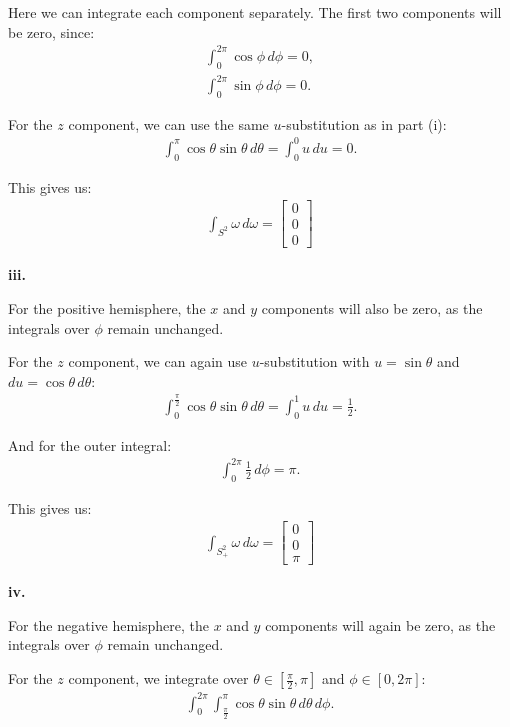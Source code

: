 Here we can integrate each component separately.
The first two components will be zero, since:
\begin{gather*}
\int_{0}^{2\pi} \cos\phi \, d\phi = 0, \\
\int_{0}^{2\pi} \sin\phi \, d\phi = 0.
\end{gather*}

For the $z$ component, we can use the same $u$-substitution as in part (i):
\begin{gather*}
\int_{0}^{\pi} \cos\theta\sin\theta \, d\theta
= \int_{0}^{0} u \, du = 0.
\end{gather*}

This gives us:
\begin{gather*}
\boxed{
\int_{S^2} \omega \, d\omega =
\begin{bmatrix}
0 \\ 0 \\ 0
\end{bmatrix}
}
\end{gather*}

\textbf{iii.}

For the positive hemisphere, the $x$ and $y$ components will also be zero, as the integrals over $\phi$ remain unchanged.

For the $z$ component, we can again use $u$-substitution with $u=\sin\theta$ and $du=\cos\theta\,d\theta$:
\begin{gather*}
\int_{0}^{\frac{\pi}{2}} \cos\theta\sin\theta \, d\theta
= \int_{0}^{1} u \, du
= \frac{1}{2}.
\end{gather*}

And for the outer integral:
\begin{gather*}
\int_{0}^{2\pi} \frac{1}{2} \, d\phi = \pi.
\end{gather*}

This gives us:
\begin{gather*}
\boxed{
\int_{S^2_+} \omega \, d\omega =
\begin{bmatrix}
0 \\ 0 \\ \pi
\end{bmatrix}
}
\end{gather*}


\textbf{iv.}

For the negative hemisphere, the $x$ and $y$ components will again be zero, as the integrals over $\phi$ remain unchanged.

For the $z$ component, we integrate over
$\theta \in [\frac{\pi}{2},\pi]$ and $\phi \in [0,2\pi]$:
\begin{gather*}
\int_{0}^{2\pi}\int_{\frac{\pi}{2}}^{\pi}
\cos\theta\sin\theta \, d\theta \, d\phi.
\end{gather*}

